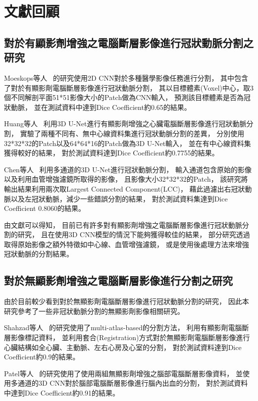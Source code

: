 \documentclass[class=NCU_thesis, crop=false]{standalone}
\begin{document}
\section{文獻回顧}
\subsection{對於有顯影劑增強之電腦斷層影像進行冠狀動脈分割之研究}
Moeskops等人~\cite{moeskopsDeepLearningMultitask2016}
的研究使用2D CNN對於多種醫學影像任務進行分割，
其中包含了對於有顯影劑電腦斷層影像進行冠狀動脈分割，
其以目標體素(Voxel)中心，取3個不同解剖平面51*51影像大小的Patch做為CNN輸入，
預測該目標體素是否為冠狀動脈，
並在測試資料中達到Dice Coefficient約0.65的結果。

Huang等人~\cite{huangCoronaryArterySegmentation2018}
利用3D U-Net進行有顯影劑增強之心臟電腦斷層影像進行冠狀動脈分割，
實驗了兩種不同有、無中心線資料集進行冠狀動脈分割的差異，
分別使用32*32*32的Patch以及64*64*16的Patch做為3D U-Net輸入，
並在有中心線資料集獲得較好的結果，
對於測試資料達到Dice Coefficient約0.7755的結果。

Chen等人~\cite{chenCoronaryArterySegmentation2019}
利用多通道的3D U-Net進行冠狀動脈分割，
輸入通道包含原始的影像以及利用血管增強濾鏡所取得的影像，
且影像大小32*32*32的Patch，
該研究將輸出結果利用兩次取Largest Connected Component(LCC)，
藉此過濾出右冠狀動脈以及左冠狀動脈，減少一些錯誤分割的結果，
對於測試資料集達到Dice Coefficient 0.8060的結果。

由文獻可以得知，
目前已有許多對有顯影劑增強之電腦斷層影像進行冠狀動脈分割的研究，
且在使用3D CNN模型的情況下能夠獲得較佳的結果，
部分研究透過取得原始影像之額外特徵如中心線、血管增強濾鏡，
或是使用後處理方法來增強冠狀動脈的分割結果。

\subsection{對於無顯影劑增強之電腦斷層影像進行分割之研究}
由於目前較少看到對於無顯影劑電腦斷層影像進行冠狀動脈分割的研究，
因此本研究參考了一些非冠狀動脈分割的無顯影劑影像相關研究。

Shahzad等人~\cite{shahzadAutomaticSegmentationQuantification2017}
的研究使用了multi-atlas-based的分割方法，
利用有顯影劑電腦斷層影像標記資料，
並利用套合(Registration)方式對於無顯影劑電腦斷層影像進行心臟結構如全心臟、主動脈、左右心房及心室的分割，
對於測試資料達到Dice Coefficient約0.9的結果。

Patel等人~\cite{patelIntracerebralHaemorrhageSegmentation2019}
的研究使用了使用兩組無顯影劑增強之腦部電腦斷層影像資料，
並使用多通道的3D CNN對於腦部電腦斷層影像進行腦內出血的分割，
對於測試資料中達到Dice Coefficient約0.91的結果。
\end{document}
